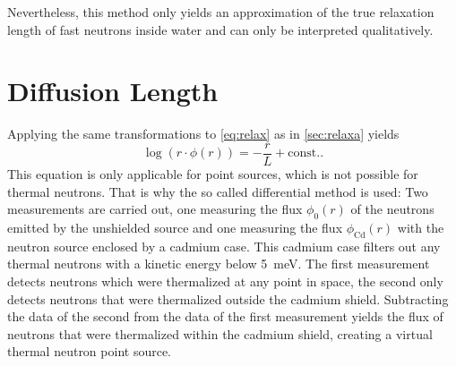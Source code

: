 Nevertheless, this method only yields an approximation of the true relaxation length of fast neutrons inside water and can only be interpreted qualitatively.

\section{Diffusion Length}
Applying the same transformations to \autoref{eq:relax} as in \autoref{sec:relaxa} yields
\begin{equation*}
	\log(r\cdot\phi(r)) = -\frac{r}{L} + \text{const.}.
\end{equation*}
This equation is only applicable for point sources, which is not possible for thermal neutrons.
That is why the so called  differential method is used:
Two measurements are carried out, one measuring the flux $\phi_0(r)$ of the neutrons emitted by the unshielded source and one measuring the flux $\phi_\text{Cd}(r)$ with the neutron source enclosed by a cadmium case.
This cadmium case filters out any thermal neutrons with a kinetic energy below \SI{5}{meV}.
The first measurement detects neutrons which were thermalized at any point in space, the second only detects neutrons that were thermalized outside the cadmium shield.
Subtracting the data of the second from the data of the first measurement yields the flux of neutrons that were thermalized within the cadmium shield, creating a virtual thermal neutron point source.
